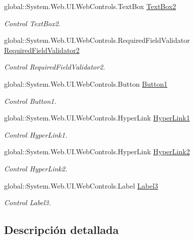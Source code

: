 \begin{DoxyCompactItemize}
global\+::\+System.\+Web.\+U\+I.\+Web\+Controls.\+Text\+Box \mbox{\hyperlink{classInicio_1_1Login_ac99495a6fbd78cbf118b7c058815e9f2}{Text\+Box2}}
\begin{DoxyCompactList}\small\item\em Control Text\+Box2. \end{DoxyCompactList}\item 
global\+::\+System.\+Web.\+U\+I.\+Web\+Controls.\+Required\+Field\+Validator \mbox{\hyperlink{classInicio_1_1Login_a072466936abf9e49afe63fb3874ddee6}{Required\+Field\+Validator2}}
\begin{DoxyCompactList}\small\item\em Control Required\+Field\+Validator2. \end{DoxyCompactList}\item 
global\+::\+System.\+Web.\+U\+I.\+Web\+Controls.\+Button \mbox{\hyperlink{classInicio_1_1Login_a538759688d96a18839d8cf330a38b4e0}{Button1}}
\begin{DoxyCompactList}\small\item\em Control Button1. \end{DoxyCompactList}\item 
global\+::\+System.\+Web.\+U\+I.\+Web\+Controls.\+Hyper\+Link \mbox{\hyperlink{classInicio_1_1Login_a3370ab8441b3a73d003560dcbcaff0d9}{Hyper\+Link1}}
\begin{DoxyCompactList}\small\item\em Control Hyper\+Link1. \end{DoxyCompactList}\item 
global\+::\+System.\+Web.\+U\+I.\+Web\+Controls.\+Hyper\+Link \mbox{\hyperlink{classInicio_1_1Login_a51395541b60da1b91a7cbbd240b4c0f3}{Hyper\+Link2}}
\begin{DoxyCompactList}\small\item\em Control Hyper\+Link2. \end{DoxyCompactList}\item 
global\+::\+System.\+Web.\+U\+I.\+Web\+Controls.\+Label \mbox{\hyperlink{classInicio_1_1Login_ad052535d49bad44248dd771596f4a8af}{Label3}}
\begin{DoxyCompactList}\small\item\em Control Label3. \end{DoxyCompactList}\end{DoxyCompactItemize}


\subsection{Descripción detallada}


